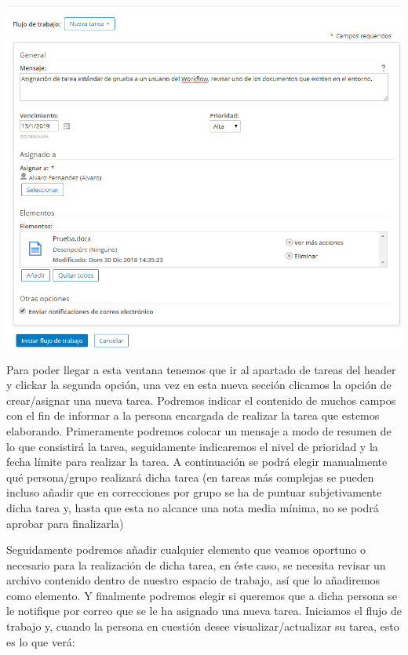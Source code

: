 \documentclass{article}
\begin{document}
\begin{center}
\includegraphics[scale=0.6]{images/task.png}
\end{center}

Para poder llegar a esta ventana tenemos que ir al apartado de tareas del header y clickar la segunda opción, una vez en esta nueva sección clicamos la opción de crear/asignar una nueva tarea.
Podremos indicar el contenido de muchos campos con el fin de informar a la persona encargada de realizar la tarea que estemos elaborando.
Primeramente podremos colocar un mensaje a modo de resumen de lo que consistirá la tarea, seguidamente indicaremos el nivel de prioridad y la fecha límite para realizar la tarea. A continuación se podrá elegir manualmente qué persona/grupo realizará dicha tarea (en tareas más complejas se pueden incluso añadir que en correcciones por grupo se ha de puntuar subjetivamente dicha tarea y, hasta que esta no alcance una nota media mínima, no se podrá aprobar para finalizarla)

Seguidamente podremos añadir cualquier elemento que veamos oportuno o necesario para la realización de dicha tarea, en éste caso, se necesita revisar un archivo contenido dentro de nuestro espacio de trabajo, así que lo añadiremos como elemento. Y finalmente podremos elegir si queremos que a dicha persona se le notifique por correo que se le ha asignado una nueva tarea.
Iniciamos el flujo de trabajo y, cuando la persona en cuestión desee visualizar/actualizar su tarea, esto es lo que verá:
\end{document}
